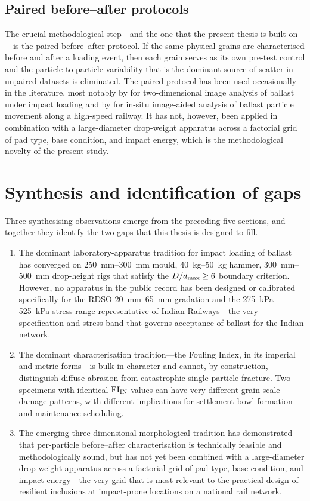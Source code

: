\subsection{Paired before--after protocols}
\label{sec:paired}

The crucial methodological step---and the one that the present thesis is built on---is the paired before--after protocol. If the same physical grains are characterised before and after a loading event, then each grain serves as its own pre-test control and the particle-to-particle variability that is the dominant source of scatter in unpaired datasets is eliminated. The paired protocol has been used occasionally in the literature, most notably by \citet{ferreira2023} for two-dimensional image analysis of ballast under impact loading and by \citet{bian2023} for in-situ image-aided analysis of ballast particle movement along a high-speed railway. It has not, however, been applied in combination with a large-diameter drop-weight apparatus across a factorial grid of pad type, base condition, and impact energy, which is the methodological novelty of the present study.

\section{Synthesis and identification of gaps}
\label{sec:gaps}

Three synthesising observations emerge from the preceding five sections, and together they identify the two gaps that this thesis is designed to fill.

\begin{enumerate}[label=\arabic*.,leftmargin=2.2em]
  \item The dominant laboratory-apparatus tradition for impact loading of ballast has converged on \qtyrange{250}{300}{\mm} mould, \qtyrange{40}{50}{\kg} hammer, \qtyrange{300}{500}{\mm} drop-height rigs that satisfy the $D/d_{\max} \ge 6$ boundary criterion. However, no apparatus in the public record has been designed or calibrated specifically for the RDSO \qtyrange{20}{65}{\mm} gradation and the \qtyrange{275}{525}{\kPa} stress range representative of Indian Railways---the very specification and stress band that governs acceptance of ballast for the Indian network.
  \item The dominant characterisation tradition---the Fouling Index, in its imperial and metric forms---is bulk in character and cannot, by construction, distinguish diffuse abrasion from catastrophic single-particle fracture. Two specimens with identical $\mathrm{FI}_{\mathrm{IN}}$ values can have very different grain-scale damage patterns, with different implications for settlement-bowl formation and maintenance scheduling.
  \item The emerging three-dimensional morphological tradition has demonstrated that per-particle before--after characterisation is technically feasible and methodologically sound, but has not yet been combined with a large-diameter drop-weight apparatus across a factorial grid of pad type, base condition, and impact energy---the very grid that is most relevant to the practical design of resilient inclusions at impact-prone locations on a national rail network.
\end{enumerate}
